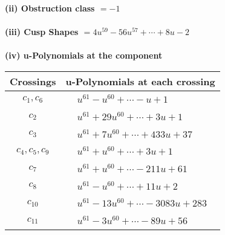 \documentclass[1p]{elsarticle_modified}
\theoremstyle{definition}
\begin{document}
\flushleft \textbf{(ii) Obstruction class $= -1$}\\~\\
\flushleft \textbf{(iii) Cusp Shapes $= 4 u^{59}-56 u^{57}+\cdots+8 u-2$}\\~\\
\newpage\renewcommand{\arraystretch}{1}
\flushleft \textbf{(iv) u-Polynomials at the component}\newline \\
\begin{tabular}{m{50pt}|m{274pt}}
Crossings & \hspace{64pt}u-Polynomials at each crossing \\
\hline $$\begin{aligned}c_{1},c_{6}\end{aligned}$$&$\begin{aligned}
&u^{61}- u^{60}+\cdots- u+1
\end{aligned}$\\
\hline $$\begin{aligned}c_{2}\end{aligned}$$&$\begin{aligned}
&u^{61}+29 u^{60}+\cdots+3 u+1
\end{aligned}$\\
\hline $$\begin{aligned}c_{3}\end{aligned}$$&$\begin{aligned}
&u^{61}+7 u^{60}+\cdots+433 u+37
\end{aligned}$\\
\hline $$\begin{aligned}c_{4},c_{5},c_{9}\end{aligned}$$&$\begin{aligned}
&u^{61}+u^{60}+\cdots+3 u+1
\end{aligned}$\\
\hline $$\begin{aligned}c_{7}\end{aligned}$$&$\begin{aligned}
&u^{61}+u^{60}+\cdots-211 u+61
\end{aligned}$\\
\hline $$\begin{aligned}c_{8}\end{aligned}$$&$\begin{aligned}
&u^{61}- u^{60}+\cdots+11 u+2
\end{aligned}$\\
\hline $$\begin{aligned}c_{10}\end{aligned}$$&$\begin{aligned}
&u^{61}-13 u^{60}+\cdots-3083 u+283
\end{aligned}$\\
\hline $$\begin{aligned}c_{11}\end{aligned}$$&$\begin{aligned}
&u^{61}-3 u^{60}+\cdots-89 u+56
\end{aligned}$\\
\hline
\end{tabular}\\~\\
\end{document}
